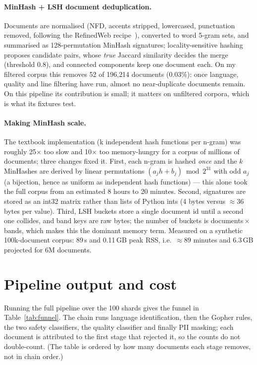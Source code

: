 \documentclass{article}
\begin{document}
\paragraph{MinHash + LSH document deduplication.}
Documents are normalised (NFD, accents stripped, lowercased, punctuation removed, following
the RefinedWeb recipe~\cite{refinedweb}), converted to word 5-gram sets, and summarised as
128-permutation MinHash signatures; locality-sensitive hashing~\cite{mmds} proposes candidate
pairs, whose \emph{true} Jaccard similarity decides the merge (threshold 0.8), and connected
components keep one document each. On my filtered corpus this
removes 52 of 196{,}214 documents (0.03\%): once language, quality and line filtering have run,
almost no near-duplicate documents remain. On this pipeline its contribution is small; it
matters on unfiltered corpora, which is what its fixtures test.

\paragraph{Making MinHash scale.}
The textbook implementation (k independent hash functions per n-gram) was roughly 25$\times$
too slow and 10$\times$ too memory-hungry for a corpus of millions of documents; three changes
fixed it.
First, each n-gram is hashed \emph{once} and the $k$ MinHashes are derived by linear
permutations $(a_j h + b_j) \bmod 2^{31}$ with odd $a_j$ (a bijection, hence as uniform as
independent hash functions) --- this alone took the full corpus from an estimated 8 hours to
20 minutes. Second, signatures are stored as an int32 matrix rather than lists of Python ints
(4 bytes versus $\approx 36$ bytes per value). Third, LSH buckets store a single document id
until a second one collides, and band keys are raw bytes; the number of buckets is
documents\,$\times$\,bands, which makes this the dominant memory term. Measured on a synthetic
100k-document corpus: 89\,s and 0.11\,GB peak RSS, i.e.\ $\approx 89$ minutes and 6.3\,GB
projected for 6M documents.

\section{Pipeline output and cost}
\label{sec:scale}

Running the full pipeline over the 100 shards gives the funnel in Table~\ref{tab:funnel}. The
chain runs language identification, then the Gopher rules, the two safety classifiers, the
quality classifier and finally PII masking; each document is attributed to the first stage that
rejected it, so the counts do not double-count. (The table is ordered by how many documents
each stage removes, not in chain order.)
\end{document}

